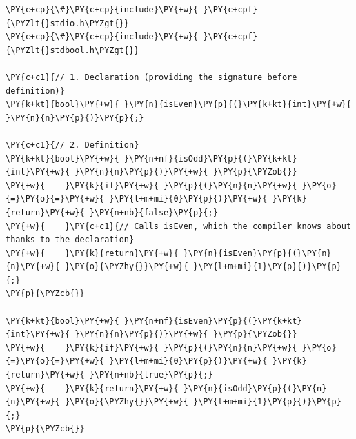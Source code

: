 \begin{Verbatim}[label=\makebox{\url{https://github.com/lucabaldini/cmepda/tree/master/slides/latex/snippets/functions_and_scope.c}},commandchars=\\\{\}]
\PY{c+cp}{\#}\PY{c+cp}{include}\PY{+w}{ }\PY{c+cpf}{\PYZlt{}stdio.h\PYZgt{}}
\PY{c+cp}{\#}\PY{c+cp}{include}\PY{+w}{ }\PY{c+cpf}{\PYZlt{}stdbool.h\PYZgt{}}

\PY{c+c1}{// 1. Declaration (providing the signature before definition)}
\PY{k+kt}{bool}\PY{+w}{ }\PY{n}{isEven}\PY{p}{(}\PY{k+kt}{int}\PY{+w}{ }\PY{n}{n}\PY{p}{)}\PY{p}{;}

\PY{c+c1}{// 2. Definition}
\PY{k+kt}{bool}\PY{+w}{ }\PY{n+nf}{isOdd}\PY{p}{(}\PY{k+kt}{int}\PY{+w}{ }\PY{n}{n}\PY{p}{)}\PY{+w}{ }\PY{p}{\PYZob{}}
\PY{+w}{    }\PY{k}{if}\PY{+w}{ }\PY{p}{(}\PY{n}{n}\PY{+w}{ }\PY{o}{=}\PY{o}{=}\PY{+w}{ }\PY{l+m+mi}{0}\PY{p}{)}\PY{+w}{ }\PY{k}{return}\PY{+w}{ }\PY{n+nb}{false}\PY{p}{;}
\PY{+w}{    }\PY{c+c1}{// Calls isEven, which the compiler knows about thanks to the declaration}
\PY{+w}{    }\PY{k}{return}\PY{+w}{ }\PY{n}{isEven}\PY{p}{(}\PY{n}{n}\PY{+w}{ }\PY{o}{\PYZhy{}}\PY{+w}{ }\PY{l+m+mi}{1}\PY{p}{)}\PY{p}{;}
\PY{p}{\PYZcb{}}

\PY{k+kt}{bool}\PY{+w}{ }\PY{n+nf}{isEven}\PY{p}{(}\PY{k+kt}{int}\PY{+w}{ }\PY{n}{n}\PY{p}{)}\PY{+w}{ }\PY{p}{\PYZob{}}
\PY{+w}{    }\PY{k}{if}\PY{+w}{ }\PY{p}{(}\PY{n}{n}\PY{+w}{ }\PY{o}{=}\PY{o}{=}\PY{+w}{ }\PY{l+m+mi}{0}\PY{p}{)}\PY{+w}{ }\PY{k}{return}\PY{+w}{ }\PY{n+nb}{true}\PY{p}{;}
\PY{+w}{    }\PY{k}{return}\PY{+w}{ }\PY{n}{isOdd}\PY{p}{(}\PY{n}{n}\PY{+w}{ }\PY{o}{\PYZhy{}}\PY{+w}{ }\PY{l+m+mi}{1}\PY{p}{)}\PY{p}{;}
\PY{p}{\PYZcb{}}


\end{Verbatim}
